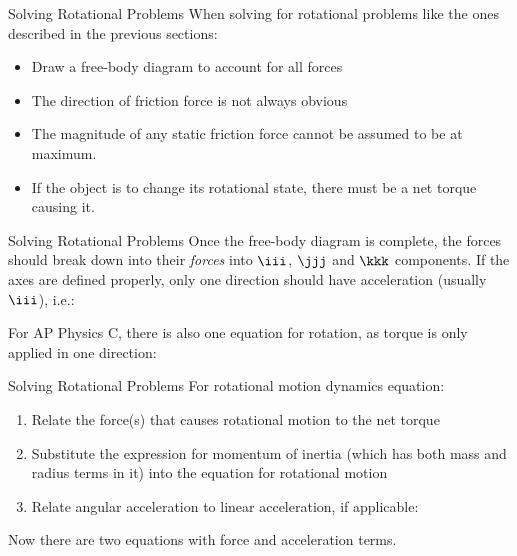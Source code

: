 \documentclass[12pt,compress,aspectratio=169]{beamer}
\begin{document}
\begin{frame}{Solving Rotational Problems}
  When solving for rotational problems like the ones described in the previous
  sections:
  \begin{itemize}
  \item Draw a free-body diagram to account for all forces
  \item The direction of friction force is not always obvious
  \item The magnitude of any static friction force cannot be assumed to be at
    maximum.
  \item If the object is to change its rotational state, there must be a net
    torque causing it.
  \end{itemize}
\end{frame}



\begin{frame}{Solving Rotational Problems}
  Once the free-body diagram is complete, the forces should break down into
  their \emph{forces} into $\iii$, $\jjj$ and $\kkk$ components. If the axes
  are defined properly, only one direction should have acceleration (usually
  $\iii$), i.e.:
  

  For AP Physics C, there is also one equation for rotation, as torque is only
  applied in one direction:
    
\end{frame}



\begin{frame}{Solving Rotational Problems}
  For rotational motion dynamics equation:
  \begin{enumerate}
  \item Relate the force(s) that causes rotational motion to the net torque

  \item Substitute the expression for momentum of inertia (which has both mass
    and radius terms in it) into the equation for rotational motion
  \item Relate angular acceleration to linear acceleration, if applicable:

  \end{enumerate}
  Now there are two equations with force and acceleration terms.
\end{frame}
\end{document}

